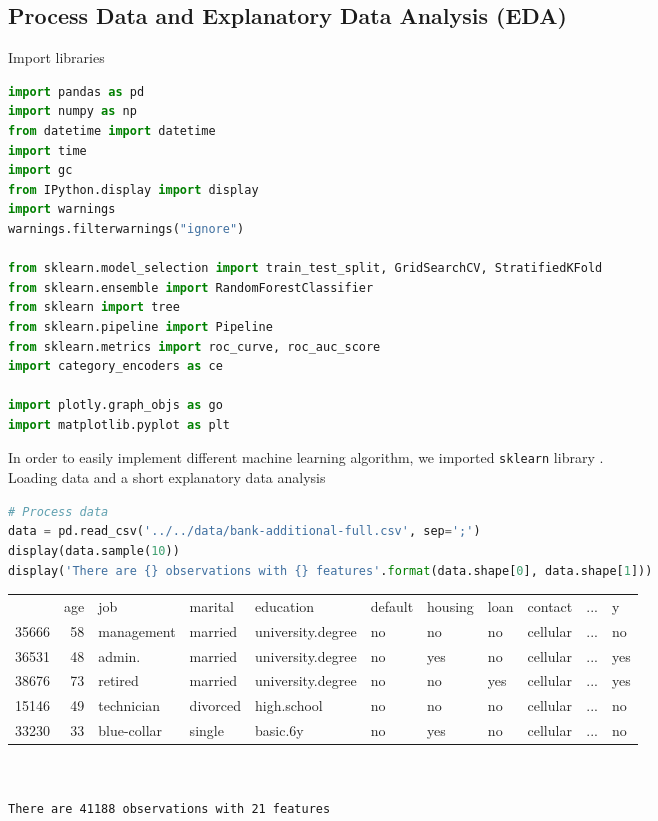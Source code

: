 \documentclass[11pt,a4paper]{article}
\begin{document}
    \subsection{Process Data and Explanatory Data Analysis (EDA)}
    Import libraries
\begin{lstlisting}[language = Python]
import pandas as pd
import numpy as np
from datetime import datetime
import time
import gc
from IPython.display import display
import warnings
warnings.filterwarnings("ignore")

from sklearn.model_selection import train_test_split, GridSearchCV, StratifiedKFold
from sklearn.ensemble import RandomForestClassifier
from sklearn import tree
from sklearn.pipeline import Pipeline
from sklearn.metrics import roc_curve, roc_auc_score
import category_encoders as ce

import plotly.graph_objs as go
import matplotlib.pyplot as plt
\end{lstlisting}

    \noindent In order to easily implement different machine learning algorithm, we imported \texttt{sklearn} library \cite{scikit-learn}. \\
    
    \noindent Loading data and a short explanatory data analysis
\begin{lstlisting}[language = Python]
# Process data
data = pd.read_csv('../../data/bank-additional-full.csv', sep=';')
display(data.sample(10))
display('There are {} observations with {} features'.format(data.shape[0], data.shape[1]))
\end{lstlisting}

    \noindent
    \begin{tabular}{lrlllllllcl}
        {} &  age &          job &   marital &          education & default & housing & loan &   contact & ... & y\\
        
        35666 &   58 &   management &   married &  university.degree &      no &      no &   no &  cellular & ... & no \\
        36531 &   48 &       admin. &   married &  university.degree &      no &     yes &   no &  cellular & ... & yes \\
        38676 &   73 &      retired &   married &  university.degree &      no &      no &  yes &  cellular & ... & yes \\
        15146 &   49 &   technician &  divorced &        high.school &      no &      no &   no &  cellular & ... & no \\
        33230 &   33 &  blue-collar &    single &           basic.6y &      no &     yes &   no &  cellular & ... & no \\
    \end{tabular} \\ \\
    \texttt{There are 41188 observations with 21 features}
    
\end{document}
